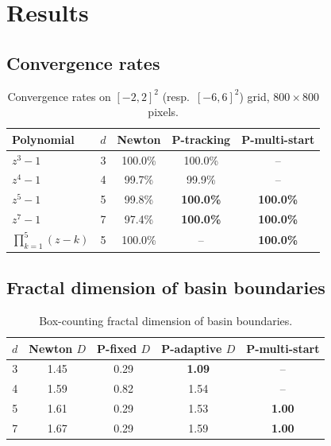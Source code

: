 \documentclass[11pt,a4paper]{article}
\theoremstyle{definition}
\theoremstyle{remark}
\begin{document}
\section{Results}
\label{sec:results}

\subsection{Convergence rates}

\begin{table}[h]
\centering
\caption{Convergence rates on $[-2, 2]^2$ (resp.\ $[-6, 6]^2$) grid, $800 \times 800$ pixels.}
\label{tab:convergence}
\begin{tabular}{l c ccc}
\toprule
Polynomial & $d$ & Newton & P-tracking & P-multi-start \\
\midrule
$z^3 - 1$ & 3 & 100.0\% & 100.0\% & -- \\
$z^4 - 1$ & 4 & 99.7\% & 99.9\% & -- \\
$z^5 - 1$ & 5 & 99.8\% & \textbf{100.0\%} & \textbf{100.0\%} \\
$z^7 - 1$ & 7 & 97.4\% & \textbf{100.0\%} & \textbf{100.0\%} \\
\midrule
$\prod_{k=1}^5(z-k)$ & 5 & 100.0\% & -- & \textbf{100.0\%} \\
\bottomrule
\end{tabular}
\end{table}

\subsection{Fractal dimension of basin boundaries}

\begin{table}[h]
\centering
\caption{Box-counting fractal dimension of basin boundaries.}
\label{tab:fractal}
\begin{tabular}{c ccc c}
\toprule
$d$ & Newton $D$ & P-fixed $D$ & P-adaptive $D$ & P-multi-start \\
\midrule
3 & 1.45 & 0.29 & \textbf{1.09} & -- \\
4 & 1.59 & 0.82 & 1.54 & -- \\
5 & 1.61 & 0.29 & 1.53 & \textbf{1.00} \\
7 & 1.67 & 0.29 & 1.59 & \textbf{1.00} \\
\bottomrule
\end{tabular}
\end{table}
\end{document}
